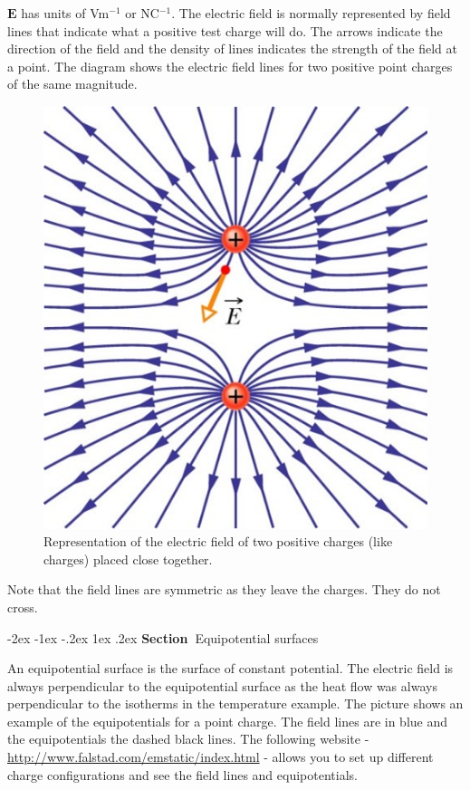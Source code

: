 \documentclass[
]{book}
\makeatletter
\renewcommand\section{%
\@startsection{section}{1}{\z@}%
              {-2ex \@plus -1ex \@minus -.2ex}%
              {1ex \@plus .2ex}%
              {\sffamily\bfseries\large\noindent Section~}}
\makeatother
\begin{document}
\(\mathbf{E}\) has units of Vm\(^{-1}\) or NC\(^{-1}\). The electric field is normally
represented by field lines that indicate what a positive test charge
will do. The arrows indicate the direction of the field and the density
of lines indicates the strength of the field at a point. The diagram
shows the electric field lines for two positive point charges of the
same magnitude.

\begin{figure}

{\centering \includegraphics[width=0.7\linewidth]{Figures/Efield_like} 

}

\caption{Representation of the electric field of two positive charges (like charges) placed close together.}\label{fig:EfieldLike}
\end{figure}

Note that the field lines are symmetric as they leave the charges. They
do not cross.

\hypertarget{equipotential-surfaces}{%
\section{Equipotential surfaces}\label{equipotential-surfaces}}

An equipotential surface is the surface of constant potential. The
electric field is always perpendicular to the equipotential surface as
the heat flow was always perpendicular to the isotherms in the
temperature example. The picture shows an example of the equipotentials
for a point charge. The field lines are in blue and the equipotentials
the dashed black lines. The following website -
\url{http://www.falstad.com/emstatic/index.html} - allows you to set up
different charge configurations and see the field lines and
equipotentials.
\end{document}
